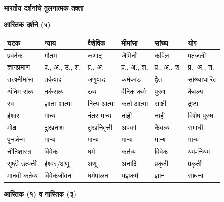 \documentclass[9pt,a4paper,landscape]{article}
\begin{document}
\begin{center}
{\Large \textbf{भारतीय दर्शनांचे तुलनात्मक तक्ता}}\\
\end{center}


\textbf{आस्तिक दर्शने (५)}

\begin{tabular}{|p{3.2cm}|p{2.4cm}|p{2.4cm}|p{2.4cm}|p{2.4cm}|p{2.4cm}|}
\hline
घटक & न्याय & वैशेषिक & मीमांसा & सांख्य & योग \\
\hline
प्रवर्तक & गौतम & कणाद & जैमिनी & कपिल & पतंजली \\
ज्ञानप्रमाण & प्र., अ., उ., श. & प्र., अ. & प्र., अ., श. & प्र., अ., श. & प्र., अ., श. \\
तत्त्वमीमांसा & तर्कवाद & अणुवाद & कर्मकांड & द्वैत & सांख्याधारित \\
अंतिम सत्य & तर्कसत्य & द्रव्य & वैदिक कर्म & पुरुष & कैवल्य \\
स्व & ज्ञाता आत्मा & नित्य आत्मा & कर्ता आत्मा & साक्षी & द्रष्टा \\
ईश्वर & मान्य & नंतर मान्य & नाही & नाही & विशेष पुरुष \\
मोक्ष & दुःखनाश & दुःखनिवृत्ती & अपवर्ग & कैवल्य & समाधी \\
पुनर्जन्म & मान्य & मान्य & मान्य & मान्य & मान्य \\
नीतिशास्त्र & विवेक & धर्म & कर्तव्य & विवेक & यम-नियम \\
सृष्टी उत्पत्ती & ईश्वर/अणू & अणू & अनादि & प्रकृती & प्रकृती \\
मानवी कर्तव्य & विवेकजीवन & धर्मपालन & यज्ञकर्म & ज्ञान & साधना \\
\hline
\end{tabular}

\vspace{0.8cm}


\textbf{आस्तिक (१) व नास्तिक (३)}
\end{document}
